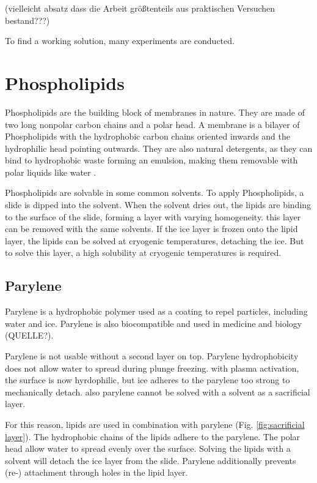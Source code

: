 
(vielleicht absatz dass die Arbeit größtenteils aus praktischen Versuchen bestand???)

To find a working solution, many experiments are conducted. 

\section{Phospholipids}
\label{section:metodeLipide}

Phospholipids are the building block of membranes in nature. They are made of two long nonpolar carbon chains and a polar head. A membrane is a bilayer of Phospholipids with the hydrophobic carbon chains oriented inwards and the hydrophilic head pointing outwards. They are also natural detergents, as they can bind to hydrophobic waste forming an emulsion, making them removable with polar liquids like water \cite{SriramaM.BhairiPh.D..}.

Phospholipids are solvable in some common solvents. To apply Phospholipids, a slide is dipped into the solvent. When the solvent dries out, the lipids are binding to the surface of the slide, forming a layer with varying homogeneity. this layer can be removed with the same solvents. If the ice layer is frozen onto the lipid layer, the lipids can be solved at cryogenic temperatures, detaching the ice. But to solve this layer, a high solubility at cryogenic temperatures is required. 


\subsection{Parylene}

Parylene is a hydrophobic polymer used as a coating to repel particles, including water and ice. Parylene is also biocompatible and used in medicine and biology (QUELLE?).

Parylene is not usable without a second layer on top. Parylene hydrophobicity does not allow water to spread during plunge freezing. with plasma activation, the surface is now hyrdophilic, but ice adheres to the parylene too strong to mechanically detach. also parylene cannot be solved with a solvent as a sacrificial layer.

For this reason, lipids are used in combination with parylene (Fig. \ref{fig:sacrificial layer}). The hydrophobic chains of the lipids adhere to the parylene. The polar head allow water to spread evenly over the surface. Solving the lipids with a solvent will detach the ice layer from the slide. Parylene additionally prevents (re-) attachment through holes in the lipid layer. 

